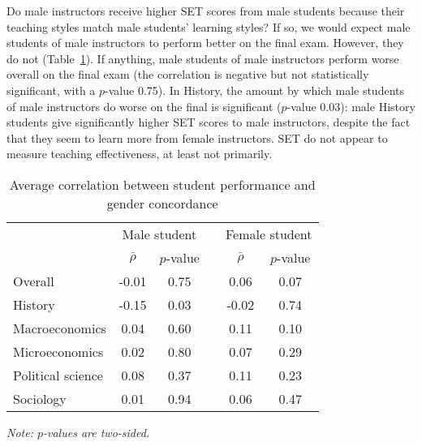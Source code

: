 \documentclass[12pt]{article}
\begin{document}
Do male instructors receive higher SET scores from male students because their 
teaching styles match male students' learning styles? 
If so, we would expect male students of male instructors to perform better on the final exam. 
However, they do not (Table~\ref{tab:finalconcordance}). 
If anything, male students of male instructors perform worse overall on the final 
exam (the correlation is negative but not statistically significant, with a $p$-value 0.75). 
In History, the amount by which male students of male instructors do worse on the final
is significant ($p$-value 0.03):
male History students give significantly higher SET scores to male instructors, 
despite the fact that they seem to learn more from female instructors. 
SET do not appear to measure teaching effectiveness, at least not primarily.

\begin{table}[htbp]
  \centering
  \footnotesize 
  \caption{Average correlation between student performance and gender concordance}
    \begin{tabular}{lccccc}
    \toprule 
          & \multicolumn{2}{c}{Male student}  &  & \multicolumn{2}{c}{Female student} \\
      & $\bar{\rho}$  &  $p$-value &  & $\bar{\rho}$  &  $p$-value    \\
                             \midrule
      \quad  Overall &            -0.01       & 0.75 & &  0.06       & 0.07  \\
      \quad  History &            -0.15       & 0.03 & &  -0.02     & 0.74   \\
      \quad  Macroeconomics &     0.04      & 0.60 & & 0.11       & 0.10   \\
      \quad  Microeconomics &     0.02       & 0.80 & &  0.07       & 0.29  \\
      \quad  Political science &  0.08       & 0.37 & &  0.11       & 0.23  \\
      \quad  Sociology &          0.01       & 0.94 & & 0.06    & 0.47  \\
    \bottomrule
    \end{tabular}%
 \label{tab:finalconcordance}%
  
  \textit{Note: $p$-values are two-sided.}
\end{table}%
\normalsize
\end{document}
